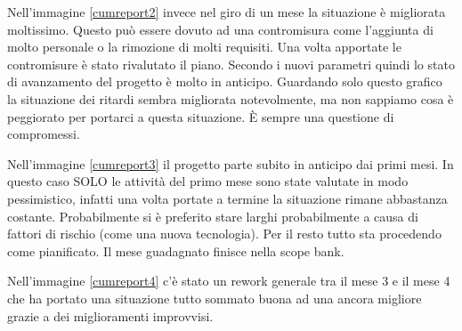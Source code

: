 \noindent Nell'immagine \ref{cumreport2} invece nel giro di un mese la situazione è migliorata moltissimo. Questo può essere dovuto ad una contromisura come l'aggiunta di molto personale o la rimozione di molti requisiti. Una volta apportate le contromisure è stato rivalutato il piano. Secondo i nuovi parametri quindi lo stato di avanzamento del progetto è molto in anticipo. Guardando solo questo grafico la situazione dei ritardi sembra migliorata notevolmente, ma non sappiamo cosa è peggiorato per portarci a questa situazione. È sempre una questione di compromessi.\newline

\noindent Nell'immagine \ref{cumreport3} il progetto parte subito in anticipo dai primi mesi. In questo caso SOLO le attività del primo mese sono state valutate in modo pessimistico, infatti una volta portate a termine la situazione rimane abbastanza costante. Probabilmente si è preferito stare larghi probabilmente a causa di fattori di rischio (come una nuova tecnologia). Per il resto tutto sta procedendo come pianificato. Il mese guadagnato finisce nella scope bank.\newline

\noindent Nell'immagine \ref{cumreport4} c'è stato un rework generale tra il mese 3 e il mese 4 che ha portato una situazione tutto sommato buona ad una ancora migliore grazie a dei miglioramenti improvvisi.

